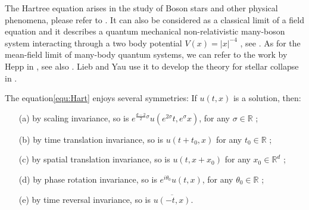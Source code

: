 \documentclass[reqno, 11pt]{amsart}
\numberwithin{equation}{section}
\newcommand{\R}{\mathbb{R}}
\theoremstyle{plain}
\theoremstyle{definition}
\numberwithin{equation}{section}
\numberwithin{theorem}{section}
\numberwithin{equation}{section}
\numberwithin{equation}{section}
\numberwithin{theorem}{section}
\begin{document}
	
	
	The Hartree equation arises in the study of Boson stars and other physical phenomena, please refer to \cite{FrohLen:Hart,Pit}. It can also be considered as a classical limit of a field equation and it describes a quantum mechanical non-relativistic many-boson system interacting through a two body potential $V(x)=|x|^{-4}$ , see \cite{GinV:NLS}. As for the mean-field limit of many-body quantum systems, we can refer to the work by Hepp in  \cite{Hepp}, see also \cite{BarEGMY, BarGM,  FrohGS, FrohLen:Hart, GinV:NLS,  Spoh}. Lieb and Yau use it to develop the theory for stellar collapse in \cite{LiebY}.
	
	The equation\eqref{equ:Hart} enjoys several symmetries: If $u(t,x)$ is a solution, then:
	\begin{enumerate}
		\item[(a)]  by scaling invariance, so is $e^{\frac{d-2}{2}\sigma }u(e^{2\sigma } t,
		e^{\sigma}x)$,  for any $\sigma \in \R $ ;
		\item[(b)] by time translation invariance, so is  $u(t+t_0, x)$ for any $t_0\in \R$ ;
		\item[(c)] by spatial translation invariance, so is  $u(t, x+x_0)$ for any $x_0\in \R^d$ ;
		\item[(d)] by phase rotation invariance, so is $e^{i\theta_0}u(t,x)$, for any $\theta_0\in \R$ ;
		\item[(e)] by time reversal invariance,  so is $\overline{u(-t, x)}$.
	\end{enumerate}
	
\end{document}
